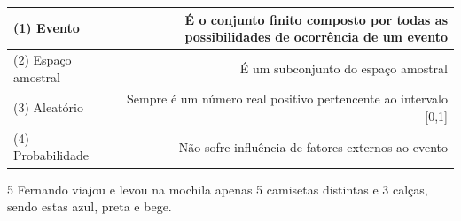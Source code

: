 \begin{escolha}
\begin{boxmedio}
\begin{boxmedio}
{\begin{boxpeq}
\begin{boxpeq}
{\begin{boxpeq}
\begin{boxmedio}
\begin{boxmedio}
\begin{boxpeq}
\begin{boxmedio}
\begin{boxpeq}
\begin{boxpeq}
\begin{boxpeq}
\begin{boxpeq}
\begin{boxmedio}
{\begin{boxmedio}
\begin{boxmedio}
\begin{boxpeq}
\begin{boxmedio}
\begin{boxpeq}
\begin{boxpeq}
\begin{boxpeq}
\begin{escolha}
{\begin{boxmedio}
\begin{boxpeq}
\begin{boxpeq}
\begin{boxpeq}
\begin{boxpeq}
\begin{boxpeq}
\begin{boxmedio}
\begin{boxpeq}
\begin{boxpeq}
\begin{boxpeq}
{\begin{boxpeq}
\begin{boxmedio}
\begin{boxpeq}
\begin{boxpeq}
\begin{boxpeq}
{\begin{boxpeq}
\begin{boxmedio}
{\begin{boxpeq}
\begin{boxpeq}
\begin{boxmedio}
\begin{boxmedio}
\begin{boxpeq}
\begin{boxpeq}
{\begin{boxpeq}
\begin{boxpeq}
\begin{boxpeq}
\begin{boxpeq}
\begin{boxpeq}
\begin{escolha}
\begin{escolha}
{\begin{boxmedio}
\begin{boxpeq}
\begin{q°}
\begin{boxmedio}
\begin{boxpeq}
\begin{boxpeq}
\begin{boxmedio}
\begin{boxmedio}
\begin{boxmedio}
\begin{boxmedio}
{\begin{enumerate}
\begin{boxpeq}
{\begin{boxpeq}
\begin{boxpeq}
\begin{boxmedio}
\begin{boxpeq}
\begin{boxpeq}
\begin{boxpeq}
{\begin{boxpeq}
\begin{boxmedio}
\begin{boxpeq}
\begin{boxpeq}
\begin{boxpeq}
\begin{table}[]
\begin{tabular}{|l|r|}
\hline
(1) Evento & É o conjunto finito composto por todas as possibilidades de ocorrência de um evento \\ \hline
(2) Espaço amostral & É um subconjunto do espaço amostral \\ \hline
(3) Aleatório & Sempre é um número real positivo pertencente ao intervalo {[}0,1{]} \\ \hline
(4) Probabilidade & Não sofre influência de fatores externos ao evento \\ \hline
\end{tabular}
\end{table}


\num{5} Fernando viajou e levou na mochila apenas 5 camisetas distintas e 3
calças, sendo estas azul, preta e bege.


\end{boxpeq}
\end{boxpeq}
\end{boxpeq}
\end{boxmedio}
\end{boxpeq}}
\end{boxpeq}
\end{boxpeq}
\end{boxpeq}
\end{boxmedio}
\end{boxpeq}
\end{boxpeq}}
\end{boxpeq}
\end{enumerate}}
\end{boxmedio}
\end{boxmedio}
\end{boxmedio}
\end{boxmedio}
\end{boxpeq}
\end{boxpeq}
\end{boxmedio}
\end{q°}
\end{boxpeq}
\end{boxmedio}}
\end{escolha}
\end{escolha}
\end{boxpeq}
\end{boxpeq}
\end{boxpeq}
\end{boxpeq}
\end{boxpeq}}
\end{boxpeq}
\end{boxpeq}
\end{boxmedio}
\end{boxmedio}
\end{boxpeq}
\end{boxpeq}}
\end{boxmedio}
\end{boxpeq}}
\end{boxpeq}
\end{boxpeq}
\end{boxpeq}
\end{boxmedio}
\end{boxpeq}}
\end{boxpeq}
\end{boxpeq}
\end{boxpeq}
\end{boxmedio}
\end{boxpeq}
\end{boxpeq}
\end{boxpeq}
\end{boxpeq}
\end{boxpeq}
\end{boxmedio}}
\end{escolha}
\end{boxpeq}
\end{boxpeq}
\end{boxpeq}
\end{boxmedio}
\end{boxpeq}
\end{boxmedio}
\end{boxmedio}}
\end{boxmedio}
\end{boxpeq}
\end{boxpeq}
\end{boxpeq}
\end{boxpeq}
\end{boxmedio}
\end{boxpeq}
\end{boxmedio}
\end{boxmedio}
\end{boxpeq}}
\end{boxpeq}
\end{boxpeq}}
\end{boxmedio}
\end{boxmedio}
\end{escolha}
